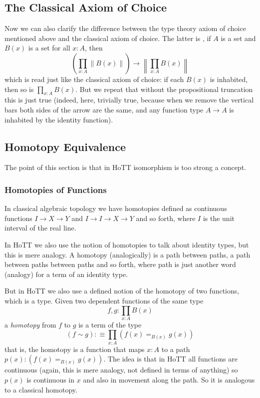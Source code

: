 \documentclass[11pt]{article}
\newcommand{\bigproptrunc}[1]{\left\lVert #1 \right\rVert}
\begin{document}
\subsection{The Classical Axiom of Choice}

Now we can also clarify the difference between the type theory axiom
of choice mentioned above and the classical axiom of choice.  The latter is
, if $A$ is a set and $B(x)$ is a set
for all $x : A$, then
\begin{equation} \label{eq:set-theoretic-axiom-of-choice}
   \left( \prod_{x : A} \bigproptrunc{B(x)} \right) \to 
   \bigproptrunc{\prod_{x : A} B(x)}
\end{equation}
which is read just like the classical axiom of choice: if each $B(x)$
is inhabited, then so is $\prod_{x : A} B(x)$.
But we repeat that without the propositional truncation this is just true
(indeed, here, trivially true, because when we remove the vertical bars
both sides of the arrow are the same, and any function type $A \to A$ is
inhabited by the identity function).

\subsection{Homotopy Equivalence}
\label{sec:homotopy-equivalence}

The point of this section is that in HoTT isomorphism is too strong a concept.

\subsubsection{Homotopies of Functions}

In classical algebraic topology we have homotopies defined as continuous
functions $I \to X \to Y$ and $I \to I \to X \to Y$ and so forth, where
$I$ is the unit interval of the real line.

In HoTT we also use the notion of homotopies to talk about identity types,
but this is mere analogy.  A homotopy (analogically) is a path between paths,
a path between paths between paths and so forth, where path is just another
word (analogy) for a term of an identity type.

But  in HoTT we also use a defined notion
of the homotopy of two functions, which is a type.  Given
two dependent functions of the same type
$$
   f, g : \prod_{x : A} B(x)
$$
a \emph{homotopy} from $f$ to $g$ is a term of the type
\begin{equation} \label{eq:homotopy-type}
   (f \sim g) :\equiv \prod_{x : A} \left(f(x) =_{B(x)} g(x)\right)
\end{equation}
that is, the homotopy is a function that maps $x : A$ to a path
$p(x) : \left(f(x) =_{B(x)} g(x)\right)$.  The idea is that in HoTT
all functions are continuous (again, this is mere analogy, not defined
in terms of anything) so $p(x)$ is continuous in $x$ and also in movement
along the path.  So it is analogous to a classical homotopy.
\end{document}
